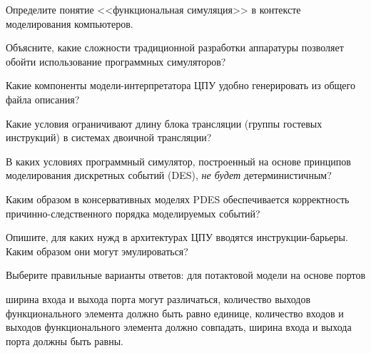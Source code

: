 \documentclass[a4paper, addpoints]{exam}
\begin{document}
\begin{questions}



\question[2] Определите понятие <<функциональная симуляция>> в контексте моделирования компьютеров.
\begin{solution}[2cm]
\end{solution}

\question[2] Объясните, какие сложности традиционной разработки аппаратуры позволяет обойти использование программных симуляторов?
\begin{solution}[2cm]
\end{solution}

\question[2] Какие компоненты модели-интерпретатора ЦПУ удобно генерировать из общего файла описания?
\begin{solution}[2cm]
\end{solution}

\question[2] Какие условия ограничивают длину блока трансляции (группы гостевых инструкций) в системах двоичной трансляции?
\begin{solution}[2cm]
\end{solution}

\question[2] В каких условиях программный симулятор, построенный на основе принципов моделирования дискретных событий (DES), \emph{не будет} детерминистичным?
\begin{solution}[2cm]
\end{solution}

\question[2] Каким образом в консервативных моделях PDES обеспечивается корректность причинно-следственного порядка моделируемых событий?
\begin{solution}[2cm]
\end{solution}

\question[2] Опишите, для каких нужд в архитектурах ЦПУ вводятся инструкции-барьеры. Каким образом они могут эмулироваться?
\begin{solution}[2cm]
\end{solution}

\question[1] Выберите правильные варианты ответов: для потактовой модели на основе портов
\begin{choices}
    \choice ширина входа и выхода порта могут различаться,
    \choice количество выходов функционального элемента должно быть равно единице,
    \choice количество входов и выходов функционального элемента должно совпадать,
    \correctchoice ширина входа и выхода порта должны быть равны.
\end{choices}


\end{questions}
\end{document}

